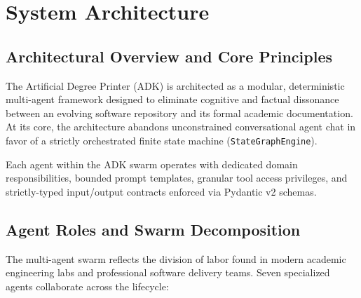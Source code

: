 \chapter{System Architecture}
\label{chap:system_architecture}

\section{Architectural Overview and Core Principles}
\label{sec:architecture_overview}

The Artificial Degree Printer (ADK) is architected as a modular, deterministic multi-agent framework designed to eliminate cognitive and factual dissonance between an evolving software repository and its formal academic documentation. At its core, the architecture abandons unconstrained conversational agent chat in favor of a strictly orchestrated finite state machine (\texttt{StateGraphEngine}).

Each agent within the ADK swarm operates with dedicated domain responsibilities, bounded prompt templates, granular tool access privileges, and strictly-typed input/output contracts enforced via Pydantic v2 schemas.

\section{Agent Roles and Swarm Decomposition}
\label{sec:agent_roles}

The multi-agent swarm reflects the division of labor found in modern academic engineering labs and professional software delivery teams. Seven specialized agents collaborate across the lifecycle:


